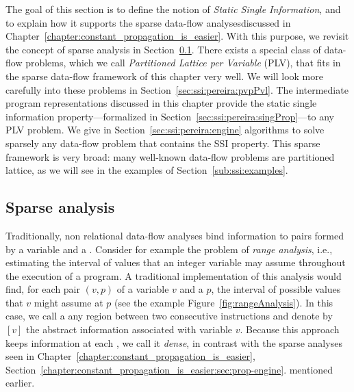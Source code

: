 {The goal of this section is to define the notion of \emph{Static Single 
Information}, and to explain how it supports 
the sparse data-flow analyses\ifconstantprop discussed in 
Chapter~\ref{chapter:constant_propagation_is_easier}\fi.
With this purpose, we revisit the concept of sparse analysis in Section~\ref{sec:ssi:pereira:sparse}.
There exists a special class of data-flow problems, which we call 
\emph{Partitioned Lattice per Variable} (PLV), that fits in the sparse 
data-flow framework of this chapter very well.
We will look more carefully into these problems in Section~\ref{sec:ssi:pereira:pvpPvl}.
The intermediate program representations discussed in this chapter provide the 
static single information property---formalized in 
Section~\ref{sec:ssi:pereira:singProp}---to any PLV problem.
We give in Section~\ref{sec:ssi:pereira:engine} algorithms to solve sparsely 
any data-flow problem that contains the SSI property.
This sparse framework is very broad: many well-known data-flow problems are 
partitioned lattice, as we will see in the examples of 
Section~\ref{sub:ssi:examples}.


\subsection{Sparse analysis}
\label{sec:ssi:pereira:sparse}

Traditionally, non relational data-flow analyses bind information to pairs formed by a variable and a \progpoint.
Consider for example the problem of \emph{range analysis}, i.e., estimating the interval of values that an 
integer variable may assume throughout the execution of a program.
A traditional implementation of this analysis would find, for each pair $(v,p)$ 
of a variable $v$ and a \progpoint $p$, the interval of possible values that 
$v$ might assume at $p$ (see the example Figure~\ref{fig:rangeAnalysis}).
In this case, we call a \progpoint any region between two consecutive 
instructions and denote by $[v]$ the abstract information associated with 
variable $v$.
Because this approach keeps information at each \progpoint, we call it {\em 
  dense}, in contrast with the sparse analyses
\ifconstantprop
seen in 
Chapter~\ref{chapter:constant_propagation_is_easier},
Section~\ref{chapter:constant_propagation_is_easier:sec:prop-engine}.
\else
mentioned earlier.
\fi
\begin{figure}[t!]


\end{figure}}
